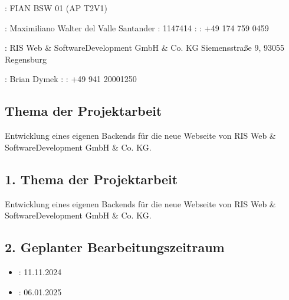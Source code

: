 \documentclass[a4paper,12pt,ngerman]{sphinxmanual}
\begin{document}
\sphinxAtStartPar
{}: FIAN BSW 01 (AP T2V1)

\sphinxAtStartPar
{}: Maximiliano Walter del Valle Santander
: 1147414
: 
: +49 174 759 0459

\sphinxAtStartPar
{}:
RIS Web\sphinxhyphen{} \& Software\sphinxhyphen{}Development GmbH \& Co. KG
Siemensstraße 9, 93055 Regensburg

\sphinxAtStartPar
{}: Brian Dymek
: 
: +49 941 20001250


\subsection{Thema der Projektarbeit}
\label{\detokenize{sections/antrag:thema-der-projektarbeit}}
\sphinxAtStartPar
Entwicklung eines eigenen Backends für die neue Webseite von RIS Web\sphinxhyphen{} \& Software\sphinxhyphen{}Development GmbH \& Co. KG.


\subsection{1. Thema der Projektarbeit}
\label{\detokenize{sections/antrag:id1}}
\sphinxAtStartPar
Entwicklung eines eigenen Backends für die neue Webseite von RIS Web\sphinxhyphen{} \& Software\sphinxhyphen{}Development GmbH \& Co. KG.


\subsection{2. Geplanter Bearbeitungszeitraum}
\label{\detokenize{sections/antrag:geplanter-bearbeitungszeitraum}}\begin{itemize}
\item {} 
\sphinxAtStartPar
{}: 11.11.2024

\item {} 
\sphinxAtStartPar
{}: 06.01.2025

\end{itemize}
\end{document}
